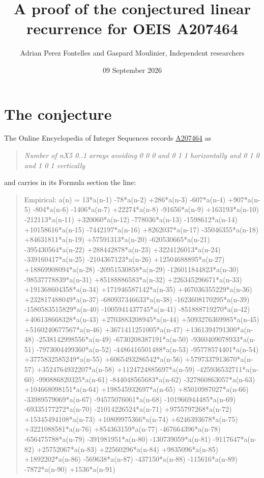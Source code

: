 \documentclass[11pt]{article}
\title{A proof of the conjectured linear recurrence for OEIS A207464}
\author{Adrian Perez Fontelles and Gaspard Moulinier, Independent researchers}
\date{09 September 2026}
\theoremstyle{definition}
\begin{document}
\maketitle
\section{The conjecture}

The Online Encyclopedia of Integer Sequences records \href{https://oeis.org/A207464}{A207464} as

\begin{quote}\itshape Number of nX5 0..1 arrays avoiding 0 0 0 and 0 1 1 horizontally and 0 1 0 and 1 0 1 vertically\end{quote}

and carries in its Formula section the line:

\begin{quote}\ttfamily Empirical: a(n) = 13*a(n-1) -78*a(n-2) +286*a(n-3) -607*a(n-4) +907*a(n-5) -804*a(n-6) -1406*a(n-7) +22274*a(n-8) -91656*a(n-9) +163193*a(n-10) -212113*a(n-11) +320060*a(n-12) -778036*a(n-13) -1598612*a(n-14) +10158616*a(n-15) -7442197*a(n-16) +8262037*a(n-17) -35046355*a(n-18) +84631811*a(n-19) +57591313*a(n-20) -620530665*a(n-21) -395430564*a(n-22) +288442878*a(n-23) +3224126013*a(n-24) -339160417*a(n-25) -2104367123*a(n-26) +12504688895*a(n-27) +18869908094*a(n-28) -20951530858*a(n-29) -126011844823*a(n-30) -98537778839*a(n-31) +85188886583*a(n-32) +226345296671*a(n-33) +191368604358*a(n-34) +171946587142*a(n-35) +467036355229*a(n-36) +232817488049*a(n-37) -680937346633*a(n-38) -1623608170295*a(n-39) -1580583515829*a(n-40) -1005941437745*a(n-41) -851888719270*a(n-42) +406138668328*a(n-43) +2703883208945*a(n-44) +5093276369985*a(n-45) +5160240677567*a(n-46) +3671411251005*a(n-47) +1361394791300*a(n-48) -2538142998556*a(n-49) -6730208387191*a(n-50) -9360409078933*a(n-51) -7973004499360*a(n-52) -4486416501488*a(n-53) -95778574401*a(n-54) +3775832585249*a(n-55) +6065493286542*a(n-56) +5797337913670*a(n-57) +3524764932207*a(n-58) +1124724885697*a(n-59) -425936532711*a(n-60) -990886820325*a(n-61) -844048565683*a(n-62) -327860863057*a(n-63) +104668098151*a(n-64) +198545932697*a(n-65) +85010987027*a(n-66) -33989579069*a(n-67) -94575076061*a(n-68) -101966944485*a(n-69) -69335177272*a(n-70) -21014226524*a(n-71) +9755797268*a(n-72) +15345494108*a(n-73) +10809975366*a(n-74) +6246393678*a(n-75) +3221088581*a(n-76) +854363159*a(n-77) -467664396*a(n-78) -656475788*a(n-79) -391981951*a(n-80) -130739059*a(n-81) -9117647*a(n-82) +25752067*a(n-83) +22560296*a(n-84) +9835096*a(n-85) +1892202*a(n-86) -569638*a(n-87) -437150*a(n-88) -115616*a(n-89) -7872*a(n-90) +1536*a(n-91)\end{quote}
\end{document}
